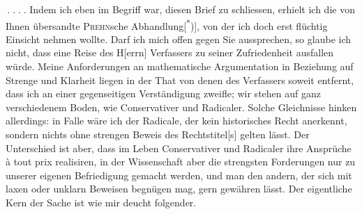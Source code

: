 \clearpage{}
\noindent \(\,{.}\;{.}\;{.}\;{.}\) Indem ich eben im Begriff war, diesen Brief zu schliessen, erhielt ich die von Ihnen übersandte \textsc{Prehn}sche Abhandlung[\textsuperscript{*})], von der ich doch erst flüchtig Einsicht nehmen wollte. Darf ich mich offen gegen Sie aussprechen, so glaube ich nicht, dass eine Reise des H[errn] Verfassers zu seiner Zufriedenheit ausfallen würde. Meine Anforderungen an mathematische Argumentation in Beziehung auf Strenge und Klarheit liegen in der That von denen des Verfassers soweit entfernt, dass ich an einer gegenseitigen Verständigung zweifle; wir stehen auf ganz verschiedenem Boden, wie Conservativer und Radicaler. Solche Gleichnisse hinken allerdings: in  Falle wäre ich der Radicale, der kein historisches Recht anerkennt, sondern nichts ohne strengen Beweis des Rechtstitel[s] gelten lässt. Der Unterschied ist aber, dass im Leben Conservativer und Radicaler ihre Ansprüche à tout prix realisiren, in der Wissenschaft aber die strengsten Forderungen nur zu unserer eigenen Befriedigung gemacht werden, und man den andern, der sich mit laxen oder unklarn Beweisen begnügen mag, gern gewähren lässt. Der eigentliche Kern der Sache ist wie mir deucht folgender.

